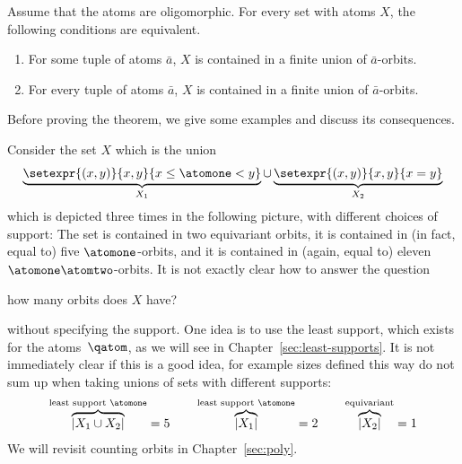 \begin{theorem}\label{thm:oligo-orbit-finite}
   Assume that the atoms are oligomorphic. For every set with atoms $X$, the following conditions are equivalent.
   \begin{enumerate}
	   \item \label{it:some-intersects} For some tuple of atoms $\bar a$, $X$ is contained in a finite union of $\bar a$-orbits.
	   \item \label{it:all-intersects} For every tuple of atoms $\bar a$, $X$ is contained in a finite union of $\bar a$-orbits.
		   \end{enumerate}	
\end{theorem}

Before proving the theorem, we give some examples and discuss its consequences. 
\begin{myexample} Consider the set $X$ which is the union
   \begin{align*}
		\underbrace{\setexpr{(x,y)} {x,y} {x \le \atomone < y}}_{X_1} \cup \underbrace{\setexpr{(x,y)} {x,y} {x = y}}_{X_2}
   \end{align*}
   which is depicted three times in the following picture, with different choices of support:
   The set is contained in two equivariant orbits, it is contained in (in fact, equal to) five $\atomone$-orbits, and it is contained in (again, equal to) eleven $\atomone \atomtwo$-orbits. It is not exactly clear how to answer the question 
   \begin{center}
	   how many orbits does $X$ have?
   \end{center}
   without specifying the support. One idea is to use the least support, which exists for the atoms~$\qatom$, as we will see in Chapter~\ref{sec:least-supports}. It is not immediately clear if this is a good idea, for example sizes defined this way do not sum up when taking unions of sets with different supports:
   \begin{align*}
	   \overbrace{|X_1 \cup X_2|}^{\text{least support $\atomone$}} = 5 \qquad \overbrace{|X_1|}^{\text{least support $\atomone$}} = 2 \qquad \overbrace{|X_2|}^{\text{equivariant}}= 1
   \end{align*}
   We will revisit counting orbits in Chapter~\ref{sec:poly}.
\end{myexample}

